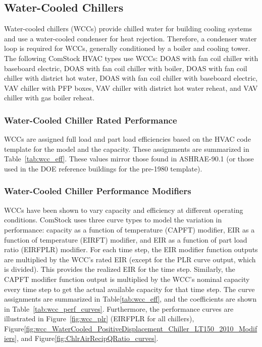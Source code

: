 
\subsection{Water-Cooled Chillers}

Water-cooled chillers (WCCs) provide chilled water for building cooling systems and use a water-cooled condenser for heat rejection. Therefore, a condenser water loop is required for WCCs, generally conditioned by a boiler and cooling tower. The following ComStock HVAC types use WCCs: DOAS with fan coil chiller with baseboard electric, DOAS with fan coil chiller with boiler, DOAS with fan coil chiller with district hot water, DOAS with fan coil chiller with baseboard electric, VAV chiller with PFP boxes, VAV chiller with district hot water reheat, and VAV chiller with gas boiler reheat.

\subsubsection{Water-Cooled Chiller Rated Performance}

WCCs are assigned full load and part load efficiencies based on the HVAC code template for the model and the capacity. These assignments are summarized in Table~\ref{tab:wcc_eff}. These values mirror those found in ASHRAE-90.1 (or those used in the DOE reference buildings for the pre-1980 template).



\subsubsection{Water-Cooled Chiller Performance Modifiers}

WCCs have been shown to vary capacity and efficiency at different operating conditions. ComStock uses three curve types to model the variation in performance: capacity as a function of temperature (CAPFT) modifier, EIR as a function of temperature (EIRFT) modifier, and EIR as a function of part load ratio (EIRFPLR) modifier. For each time step, the EIR modifier function outputs are multiplied by the WCC's rated EIR (except for the PLR curve output, which is divided). This provides the realized EIR for the time step. Similarly, the CAPFT modifier function output is multiplied by the WCC's nominal capacity every time step to get the actual available capacity for that time step. The curve assignments are summarized in Table\ref{tab:wcc_eff}, and the coefficients are shown in Table~\ref{tab:wcc_perf_curves}. Furthermore, the performance curves are illustrated in Figure~\ref{fig:wcc_plr} (EIRFPLR for all chillers), Figure\ref{fig:wcc_WaterCooled_PositiveDisplacement_Chiller_LT150_2010_Modifiers}, and Figure\ref{fig:ChlrAirRecipQRatio_curves}.


